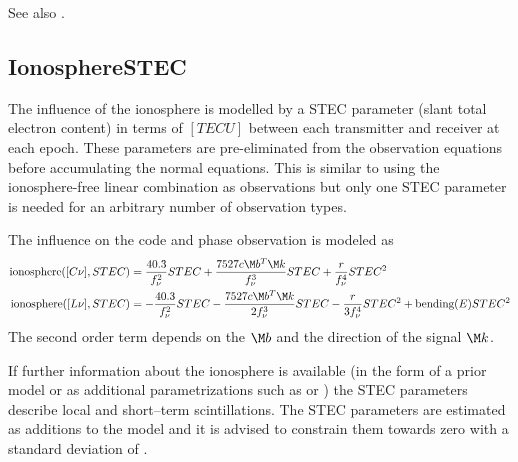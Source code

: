 See also .


\subsection{IonosphereSTEC}\label{gnssParametrizationType:ionosphereSTEC}
The influence of the ionosphere is modelled by a STEC parameter (slant total electron content)
in terms of $[TECU]$ between each transmitter and receiver at each epoch. These parameters are pre-eliminated
from the observation equations before accumulating the normal equations.
This is similar to using the ionosphere-free linear combination as observations
but only one STEC parameter is needed for an arbitrary number of observation types.

The influence on the code and phase observation is modeled as
\begin{equation}
\begin{split}
\text{ionosphere}([C\nu], STEC) &=  \frac{40.3}{f_{\nu}^2}STEC + \frac{7527 c \M b^T\M k}{f_{\nu}^3}STEC +  \frac{r}{f_{\nu}^4}STEC^2 \\
\text{ionosphere}([L\nu], STEC) &= -\frac{40.3}{f_{\nu}^2}STEC - \frac{7527 c \M b^T\M k}{2f_{\nu}^3}STEC - \frac{r}{3f_{\nu}^4}STEC^2 + \text{bending}(E)STEC^2
\end{split}
\label{gnssParametrizationType:IonosphereSTEC:STEC}
\end{equation}
The second order term depends on the  $\M b$
and the direction of the signal $\M k$.

If further information about the ionosphere is available
(in the form of a prior model or as additional parametrizations
such as  or
) the STEC
parameters describe local and short–term scintillations. The STEC parameters are estimated
as additions to the model and it is advised to constrain them towards zero
with a standard deviation of .


